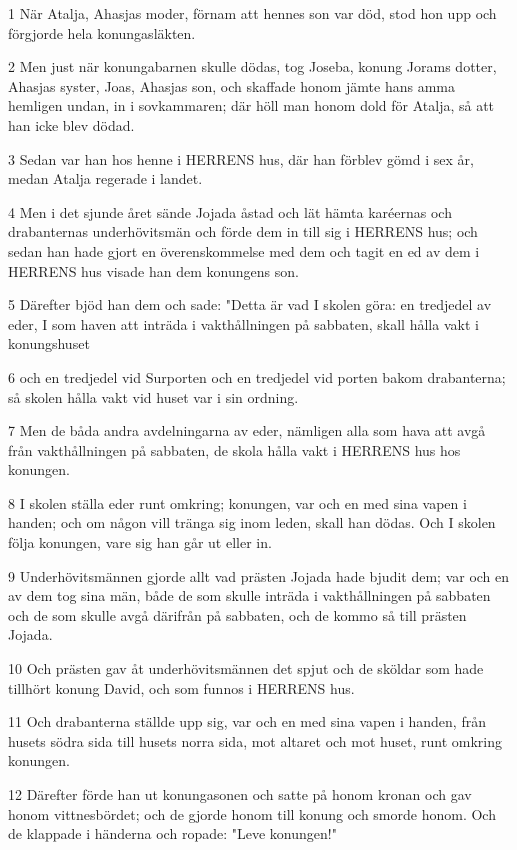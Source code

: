 \par 1 När Atalja, Ahasjas moder, förnam att hennes son var död, stod hon upp och förgjorde hela konungasläkten.
\par 2 Men just när konungabarnen skulle dödas, tog Joseba, konung Jorams dotter, Ahasjas syster, Joas, Ahasjas son, och skaffade honom jämte hans amma hemligen undan, in i sovkammaren; där höll man honom dold för Atalja, så att han icke blev dödad.
\par 3 Sedan var han hos henne i HERRENS hus, där han förblev gömd i sex år, medan Atalja regerade i landet.
\par 4 Men i det sjunde året sände Jojada åstad och lät hämta karéernas och drabanternas underhövitsmän och förde dem in till sig i HERRENS hus; och sedan han hade gjort en överenskommelse med dem och tagit en ed av dem i HERRENS hus visade han dem konungens son.
\par 5 Därefter bjöd han dem och sade: "Detta är vad I skolen göra: en tredjedel av eder, I som haven att inträda i vakthållningen på sabbaten, skall hålla vakt i konungshuset
\par 6 och en tredjedel vid Surporten och en tredjedel vid porten bakom drabanterna; så skolen hålla vakt vid huset var i sin ordning.
\par 7 Men de båda andra avdelningarna av eder, nämligen alla som hava att avgå från vakthållningen på sabbaten, de skola hålla vakt i HERRENS hus hos konungen.
\par 8 I skolen ställa eder runt omkring; konungen, var och en med sina vapen i handen; och om någon vill tränga sig inom leden, skall han dödas. Och I skolen följa konungen, vare sig han går ut eller in.
\par 9 Underhövitsmännen gjorde allt vad prästen Jojada hade bjudit dem; var och en av dem tog sina män, både de som skulle inträda i vakthållningen på sabbaten och de som skulle avgå därifrån på sabbaten, och de kommo så till prästen Jojada.
\par 10 Och prästen gav åt underhövitsmännen det spjut och de sköldar som hade tillhört konung David, och som funnos i HERRENS hus.
\par 11 Och drabanterna ställde upp sig, var och en med sina vapen i handen, från husets södra sida till husets norra sida, mot altaret och mot huset, runt omkring konungen.
\par 12 Därefter förde han ut konungasonen och satte på honom kronan och gav honom vittnesbördet; och de gjorde honom till konung och smorde honom. Och de klappade i händerna och ropade: "Leve konungen!"
